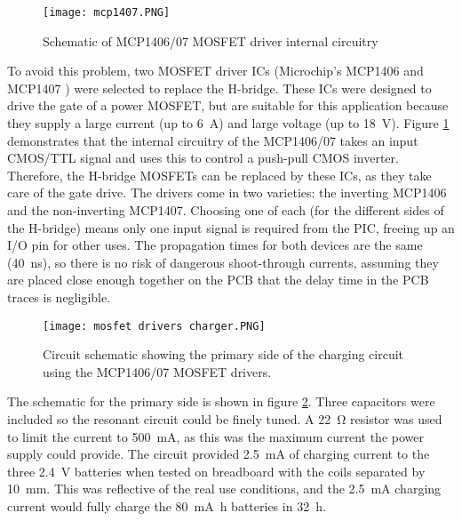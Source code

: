 \begin{figure}[htb]
	\centering
	\texttt{[image: mcp1407.PNG]}
	\caption{Schematic of MCP1406/07 MOSFET driver internal circuitry \cite{mcp1407}}
	\label{fig: mcp1407}
\end{figure}

To avoid this problem, two MOSFET driver ICs (Microchip's MCP1406 and MCP1407 \cite{mcp1407}) were selected to replace the H-bridge. These ICs were designed to drive the gate of a power MOSFET, but are suitable for this application because they supply a large current (up to \SI{6}{\ampere}) and large voltage (up to \SI{18}{\volt}). Figure \ref{fig: mcp1407} demonstrates that the internal circuitry of the MCP1406/07 takes an input CMOS/TTL signal and uses this to control a push-pull CMOS inverter. Therefore, the H-bridge MOSFETs can be replaced by these ICs, as they take care of the gate drive. The drivers come in two varieties: the inverting MCP1406 and the non-inverting MCP1407. Choosing one of each (for the different sides of the H-bridge) means only one input signal is required from the PIC, freeing up an I/O pin for other uses. The propagation times for both devices are the same (\SI{40}{\nano\second}), so there is no risk of dangerous shoot-through currents, assuming they are placed close enough together on the PCB that the delay time in the PCB traces is negligible.\\

\begin{figure}[htb]
	\centering
	\texttt{[image: mosfet drivers charger.PNG]}
	\caption{Circuit schematic showing the primary side of the charging circuit using the MCP1406/07 MOSFET drivers.}
	\label{fig: mosfet drivers charger}
\end{figure}

The schematic for the primary side is shown in figure \ref{fig: mosfet drivers charger}. Three capacitors were included so the resonant circuit could be finely tuned. A \SI{22}{\ohm} resistor was used to limit the current to \SI{500}{\milli\ampere}, as this was the maximum current the power supply could provide. The circuit provided \SI{2.5}{\milli\ampere} of charging current to the three \SI{2.4}{\volt} batteries when tested on breadboard with the coils separated by \SI{10}{\milli\metre}. This was reflective of the real use conditions, and the \SI{2.5}{\milli\ampere} charging current would fully charge the \SI{80}{\milli\ampere\hour} batteries in \SI{32}{\hour}.\\

